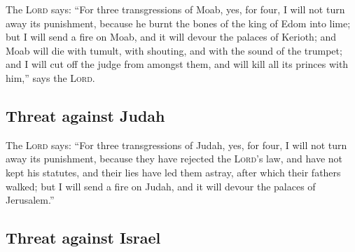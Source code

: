  The \textsc{Lord} says: ``For three transgressions of
Moab, yes, for four, I will not turn away its punishment, because he
burnt the bones of the king of Edom into lime;  but I will
send a fire on Moab, and it will devour the palaces of Kerioth; and Moab
will die with tumult, with shouting, and with the sound of the trumpet;
 and I will cut off the judge from amongst them, and will
kill all its princes with him,'' says the \textsc{Lord}.

\hypertarget{threat-against-judah}{%
\subsection{Threat against Judah}\label{threat-against-judah}}

 The \textsc{Lord} says: ``For three transgressions of
Judah, yes, for four, I will not turn away its punishment, because they
have rejected the \textsc{Lord}'s law, and have not kept his statutes,
and their lies have led them astray, after which their fathers walked;
 but I will send a fire on Judah, and it will devour the
palaces of Jerusalem.''

\hypertarget{threat-against-israel}{%
\subsection{Threat against Israel}\label{threat-against-israel}}

